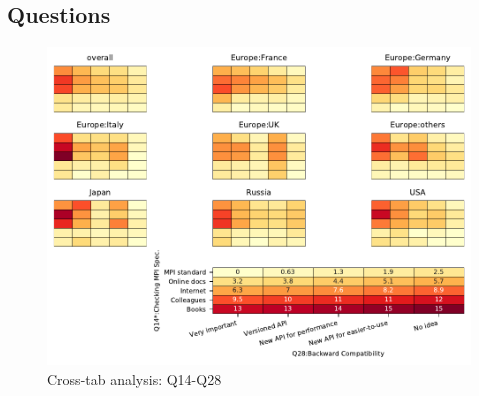 
\subsection{Questions}


\begin{figure}
\begin{center}
\includegraphics[width=12cm]{../pdfs/Q14-Q28.pdf}
\caption{Cross-tab analysis: Q14-Q28}
\label{fig:Q14-Q28}
\end{center}
\end{figure}
